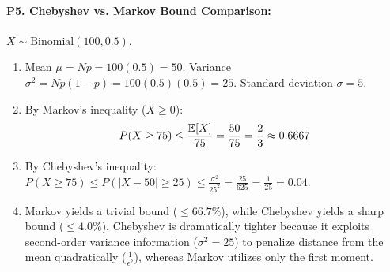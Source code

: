 \paragraph{P5. Chebyshev vs. Markov Bound Comparison:}
$X \sim \text{Binomial}(100, 0.5)$.
\begin{enumerate}[label=(\alph*)]
    \item Mean $\mu = N p = 100(0.5) = 50$.
    Variance $\sigma^2 = N p(1 - p) = 100(0.5)(0.5) = 25$. Standard deviation $\sigma = 5$.
    \item By Markov's inequality ($X \ge 0$):
    \begin{equation*}
    P(X \ge 75) \le \frac{\operatorname{\mathbb{E}}[X]}{75} = \frac{50}{75} = \frac{2}{3} \approx 0.6667
    \end{equation*}
    \item By Chebyshev's inequality:
    $P(X \ge 75) \le P(|X - 50| \ge 25) \le \frac{\sigma^2}{25^2} = \frac{25}{625} = \frac{1}{25} = 0.04$.
    \item Markov yields a trivial bound ($\le 66.7\%$), while Chebyshev yields a sharp bound ($\le 4.0\%$). Chebyshev is dramatically tighter because it exploits second-order variance information ($\sigma^2 = 25$) to penalize distance from the mean quadratically ($\frac{1}{\epsilon^2}$), whereas Markov utilizes only the first moment.
\end{enumerate}


